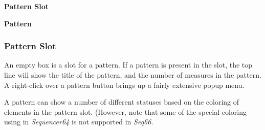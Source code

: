    \begin{enumber}
      \item \textbf{Pattern Slot}
      \item \textbf{Pattern}
   \end{enumber}

\subsubsection{Pattern Slot}
\label{subsubsec:patterns_pattern_slot}

   An empty box is a slot for a pattern.
   If a pattern is present in the slot, the top line will show
   the title of the pattern, and the number of measures in the pattern.
   A right-click over a pattern button brings up a fairly extensive
   popup menu.

%

   A pattern can show a number of different statuses based on the coloring
   of elements in the pattern slot.
   (However, note that some of the special coloring using in
   \textsl{Sequencer64} is not supported in \textsl{Seq66}.

